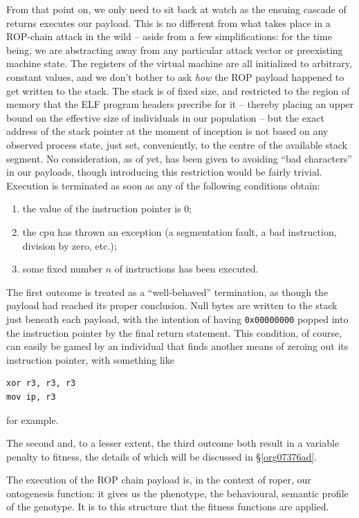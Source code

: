 \documentclass[12pt,glossary]{dalthesis}
\begin{document}
From that point on, we only need to sit back at watch as the ensuing cascade of
returns executes our payload. This is no different from what takes place in
a ROP-chain attack in the wild -- aside from a few simplifications: for the time
being, we are abstracting away from any particular attack vector or preexisting
machine state. The registers of the virtual machine are all initialized to arbitrary,
constant values, and we don't bother to ask \emph{how} the ROP payload happened to get
written to the stack. The stack is of fixed size, and restricted to the region
of memory that the ELF program headers precribe for it -- thereby placing an upper
bound on the effective size of individuals in our population -- but the exact
address of the stack pointer at the moment of inception is not based on any
observed process state, just set, conveniently, to the centre of the available
stack segment. No consideration, as of yet, has been given to avoiding ``bad
characters'' in our payloads, though introducing this restriction would be fairly
trivial. Execution is terminated as soon as any of the following conditions obtain:
\begin{enumerate}
\item the value of the instruction pointer is 0;
\item the \gls{cpu} has thrown an exception (a segmentation fault, a bad instruction,
division by zero, etc.);
\item some fixed number \(n\) of instructions has been executed.
\end{enumerate}

The first outcome is treated as a ``well-behaved'' termination, as though the
payload had reached its proper conclusion. Null bytes are written to the
stack just beneath each payload, with the intention of having \texttt{0x00000000}
popped into the instruction pointer by the final return statement. This condition, 
of course, can easily be gamed by an individual that finds another means of
zeroing out its instruction pointer, with something like
\begin{verbatim}
xor r3, r3, r3
mov ip, r3
\end{verbatim}
for example. 

The second and, to a lesser extent, the third outcome both result in a variable
penalty to fitness, the details of which will be discussed in \S \ref{org07376ad}.

The execution of the ROP chain payload is, in the context of \gls{roper}, our
ontogenesis function: it gives us the phenotype, the behavioural, semantic
profile of the genotype. It is to this structure that the fitness functions
are applied. 
\end{document}
